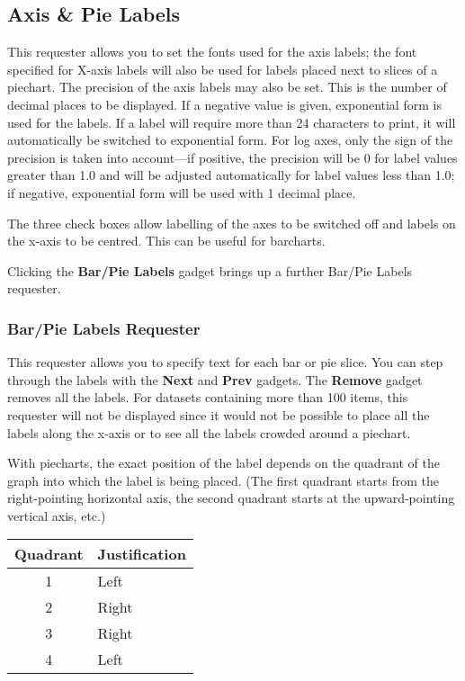 \subsection{Axis \& Pie Labels}
This requester allows you to set the fonts used for the axis labels;
the font specified for X-axis labels will also be used for labels placed next 
to slices of a piechart. 
The precision of the axis labels may also be set. This is the number of decimal 
places to be displayed. If a negative value is given, exponential form is used for 
the labels. If a label will require more than 24 characters to print, it will 
automatically be switched to exponential form. For log axes, only the sign of the 
precision is taken into account---if positive, the precision will be 0 for label 
values greater than 1.0 and will be adjusted automatically for label values less 
than 1.0; if negative, exponential form will be used with 1 decimal place.

The three check boxes allow labelling of the axes to be switched off and labels 
on the x-axis to be centred. This can be useful for barcharts.

Clicking the {\bf Bar/Pie Labels} gadget brings up a further Bar/Pie Labels requester.

\subsubsection{Bar/Pie Labels Requester}
\label{ss:bplab}
This requester allows you to specify text for each bar or pie slice. You 
can step through the labels with the {\bf Next} and {\bf Prev} gadgets. The 
{\bf Remove} gadget removes all the labels. For datasets containing more than 100 
items, this requester 
will not be displayed since it would not be possible to place all the 
labels along the x-axis or to see all the labels crowded around a piechart.

With piecharts, the exact position of the label depends on the quadrant of the graph 
into which the label is being placed. (The first quadrant starts from the 
right-pointing horizontal axis, the second quadrant starts at the upward-pointing 
vertical axis, etc.)

\begin{center}
\begin{tabular}{|c|l|}\hline
Quadrant & Justification   \\ \hline
1        & Left            \\
2        & Right           \\
3        & Right           \\
4        & Left            \\ \hline
\end{tabular}
\end{center}

